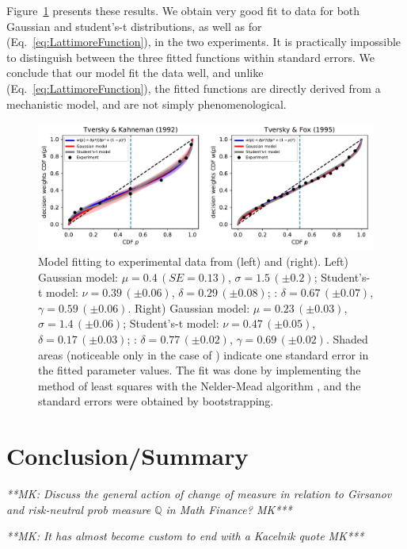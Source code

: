 \documentclass[a4paper, 12pt]{article}
\newcommand{\eref}[1]{(Eq.~\ref{eq:#1})}
\newcommand{\flabel}[1]{\label{fig:#1}}
\newcommand{\Fref}[1]{Figure~\ref{fig:#1}}
\newcommand{\MK}[1]{{\it ***MK: #1 MK***}}
\begin{document}
\Fref{TK_TF_fit} presents these results. We obtain very good fit to data for both Gaussian and student's-t distributions, as well as for \eref{LattimoreFunction}, in the two experiments. It is practically impossible to distinguish between the three fitted functions within standard errors. We conclude that our model fit the data well, and unlike \eref{LattimoreFunction}, the fitted functions are directly derived from a mechanistic model, and are not simply phenomenological.

\begin{figure}[htb]
\centering
\includegraphics[width=1.0\textwidth]{./figs/TK_TF_fit.pdf}
\caption{Model fitting to experimental data from \cite{TverskyKahneman1992} (left) and \cite{TverskyFox1995} (right).
Left) Gaussian model: $\mu=0.4\,\left(SE = 0.13\right)$, $\sigma=1.5\,\left(\pm0.2\right)$; Student's-t model: $\nu=0.39\,\left(\pm0.06\right)$, $\delta=0.29\,\left(\pm0.08\right)$; \cite{LattimoreBakerWitte1992}: $\delta=0.67\,\left(\pm0.07\right)$, $\gamma=0.59\,\left(\pm0.06\right)$. Right) Gaussian model: $\mu=0.23\,\left(\pm0.03\right)$, $\sigma=1.4\,\left(\pm0.06\right)$; Student's-t model: $\nu=0.47\,\left(\pm0.05\right)$, $\delta=0.17\,\left(\pm0.03\right)$; \cite{LattimoreBakerWitte1992}: $\delta=0.77\,\left(\pm0.02\right)$, $\gamma=0.69\,\left(\pm0.02\right)$. Shaded areas (noticeable only in the case of \cite{TverskyKahneman1992}) indicate one standard error in the fitted parameter values. The fit was done by implementing the method of least squares with the Nelder-Mead algorithm \cite{NelderMead1965}, and the standard errors were obtained by bootstrapping.}
\flabel{TK_TF_fit}
\end{figure}


\section{Conclusion/Summary}
\MK{Discuss the general action of change of measure in relation to Girsanov and risk-neutral prob measure $\mathbb{Q}$ in Math Finance?}

\MK{It has almost become custom to end with a Kacelnik quote}





\end{document}
